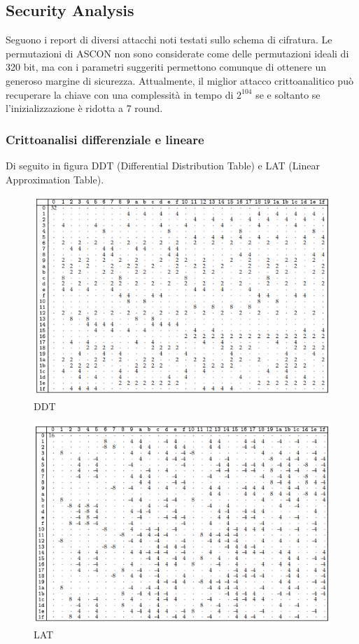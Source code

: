 \subsection{Security Analysis}
Seguono i report di diversi attacchi noti testati sullo schema di cifratura. Le permutazioni di ASCON non sono considerate come delle permutazioni ideali di 320 bit, ma con i parametri suggeriti permettono comunque di ottenere un generoso margine di sicurezza. 
\newline\newline
Attualmente, il miglior attacco crittoanalitico può recuperare la chiave con una complessità in tempo di $2^{104}$ se e soltanto se l'inizializzazione è ridotta a 7 round. 
\subsubsection{Crittoanalisi differenziale e lineare}
Di seguito in figura DDT (Differential Distribution Table) e LAT (Linear Approximation Table). 
\begin{figure}[h!]
    \centering
    \includegraphics[width=12cm]{images/ddt.png}
    \caption[short]{DDT}
\end{figure}
\begin{figure}[h!]
    \centering
    \includegraphics[width=12cm]{images/lat.png}
    \caption[short]{LAT}
\end{figure}

\newpage